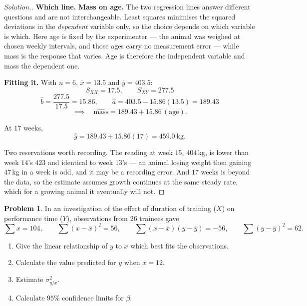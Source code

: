 \documentclass[11pt,a4paper]{article}
\theoremstyle{definition}
\newtheorem{problemx}{Problem}[section]
\newenvironment{problem}{\begin{problemx}}{\end{problemx}}
\newenvironment{solution}
  {\renewcommand{\qedsymbol}{}\begin{proof}[\textit{Solution}.]}
  {\end{proof}}
\begin{document}
\begin{solution}
\textbf{Which line.} \textbf{Mass on age.} The two regression lines answer different
questions and are not interchangeable. Least squares minimises the squared deviations in the
\emph{dependent} variable only, so the choice depends on which variable is which. Here age is
fixed by the experimenter --- the animal was weighed at chosen weekly intervals, and those
ages carry no measurement error --- while mass is the response that varies. Age is therefore
the independent variable and mass the dependent one.

\textbf{Fitting it.} With $n=6$, $\overline{x}=13.5$ and $\overline{y}=403.5$:
\[S_{XX}=17.5,\qquad S_{XY}=277.5\]
\[\widehat{b}=\frac{277.5}{17.5}=15.86,\qquad \widehat{a}=403.5-15.86(13.5)=189.43\]
\[\implies\quad \widehat{\text{mass}}=189.43+15.86\,(\text{age}).\]

At $17$ weeks,
\[\widehat{y}=189.43+15.86(17)=459.0\ \text{kg}.\]

Two reservations worth recording. The reading at week $15$, $404$\,kg, is lower than week
$14$'s $423$ and identical to week $13$'s --- an animal losing weight then gaining $47$\,kg in
a week is odd, and it may be a recording error. And $17$ weeks is beyond the data, so the
estimate assumes growth continues at the same steady rate, which for a growing animal it
eventually will not.
\end{solution}

\begin{problem}
In an investigation of the effect of duration of training ($X$) on performance time ($Y$),
observations from $26$ trainees gave
\[\sum x=104,\qquad \sum(x-\overline{x})^2=56,\qquad \sum(x-\overline{x})(y-\overline{y})=-56,
\qquad \sum(y-\overline{y})^2=62.\]
\begin{enumerate}
\item[(a).] Give the linear relationship of $y$ to $x$ which best fits the observations.
\item[(b).] Calculate the value predicted for $y$ when $x=12$.
\item[(c).] Estimate $\sigma^2_{y/x}$.
\item[(d).] Calculate $95\%$ confidence limits for $\beta$.
\end{enumerate}
\end{problem}
\end{document}
